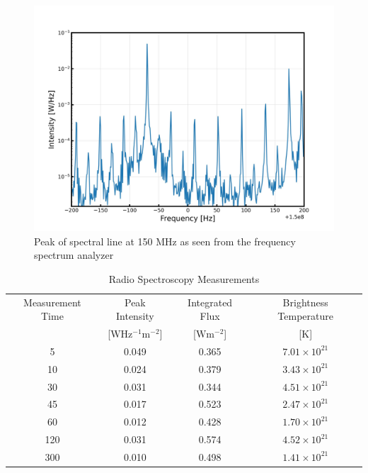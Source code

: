 \documentclass[12pt]{article}
\begin{document}
\begin{figure}[H]
\centering
\includegraphics[scale=.5]{fig/Exercise 1.94.jpg}
\caption{Peak of spectral line at 150 MHz as seen from the frequency spectrum analyzer}
\label{fig1.14}
\end{figure}


\begin{table}[H]
    \centering
    \caption{Radio Spectroscopy Measurements}
    \label{T7}
    \begin{tabular}{c |c |c |c}
        \hline
        \hline
        Measurement Time& Peak Intensity & Integrated Flux & Brightness Temperature \\\relax
        [s] & [$\mathrm{W Hz^{-1} m^{-2}}$] & [$\mathrm{W m^{-2}}$]  & [K] \\
        \hline
        5 & 0.049 & 0.365 & $7.01 \times 10^{21}$ \\
        10 & 0.024 & 0.379 & $3.43 \times 10^{21}$ \\
        30 & 0.031 & 0.344 & $4.51 \times 10^{21}$ \\
        45 & 0.017 & 0.523 & $2.47 \times 10^{21}$ \\
        60 & 0.012 & 0.428 & $1.70 \times 10^{21}$ \\
        120 & 0.031 & 0.574 & $4.52 \times 10^{21}$ \\
        300 & 0.010 & 0.498 & $1.41 \times 10^{21}$ \\
        \hline
    \end{tabular}
    \label{tab:mytable}
\end{table}
\end{document}
